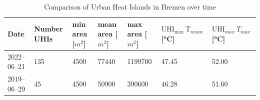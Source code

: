 \documentclass[12pt,a4paper, english,twoside]{scrartcl}
\begin{document}
\begin{landscape}
    \begin{table}[ht]
      \renewcommand{\arraystretch}{1.4}
      \centering
      \caption{Comparison of Urban Heat Islands in Bremen over time\label{tab:UHIBremenStats}}
      \begin{tabular}{l lll lll}
        \toprule
        \textbf{Date}& Number UHIs & min area [$m^2$]& mean area [$m^2$]& max area [$m^2$]& $\text{UHI}_{\text{max}}~\text{T}_{mean}$ [°C]& $\text{UHI}_{max}~T_{max}$ [°C]\\
             \midrule
        2022--06--21 & 135 & 4500 & 77440 & 1199700  & 47.45 & 52.00 \\ 
        2019--06--29 &  45 & 4500 & 50900 &  390600  & 46.28 & 51.60 \\
        \bottomrule
      \end{tabular}
    \end{table}

\end{landscape}
  
\end{document}
